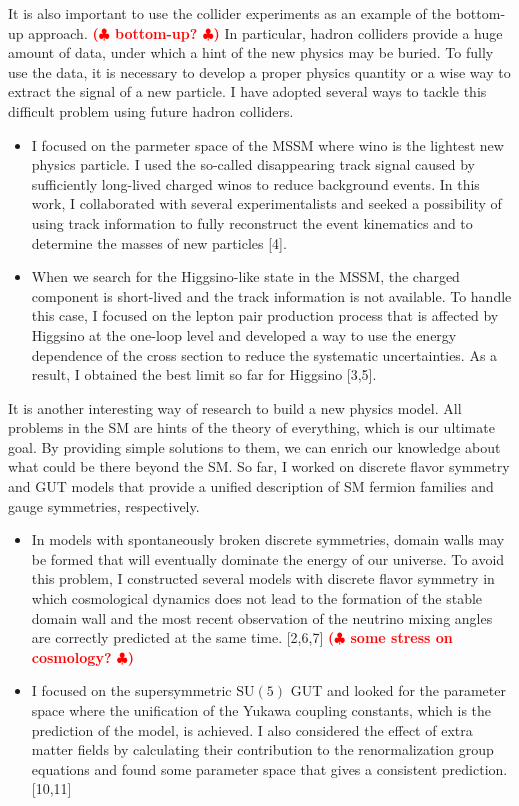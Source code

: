 \documentclass[12pt,notitlepage]{article}
\def\rem#1{ {\bf\textcolor{red}{($\clubsuit$ #1 $\clubsuit$)}}}
\begin{document}
It is also important to use the collider experiments as an example of the bottom-up approach.
\rem{bottom-up?}
In particular, hadron colliders provide a huge amount of data, under which a hint of the new physics may be buried.
To fully use the data, it is necessary to develop a proper physics quantity or a wise way to extract the signal of a new particle.
I have adopted several ways to tackle this difficult problem using future hadron colliders.
\begin{itemize}
  \item
    I focused on the parmeter space of the MSSM where wino is the lightest new physics particle.
    I used the so-called disappearing track signal caused by sufficiently long-lived charged winos to reduce background events.
    In this work, I collaborated with several experimentalists and seeked a possibility of using track information to fully reconstruct the event kinematics and to determine the masses of new particles [4].
  \item
    When we search for the Higgsino-like state in the MSSM, the charged component is short-lived and the track information is not available.
    To handle this case, I focused on the lepton pair production process that is affected by Higgsino at the one-loop level and developed a way to use the energy dependence of the cross section to reduce the systematic uncertainties.
    As a result, I obtained the best limit so far for Higgsino [3,5].
\end{itemize}

It is another interesting way of research to build a new physics model.
All problems in the SM are hints of the theory of everything, which is our ultimate goal.
By providing simple solutions to them, we can enrich our knowledge about what could be there beyond the SM.
So far, I worked on discrete flavor symmetry and GUT models that provide a unified description of SM fermion families and gauge symmetries, respectively.
\begin{itemize}
  \item In models with spontaneously broken discrete symmetries, domain walls may be formed that will eventually dominate the energy of our universe.
  To avoid this problem, I constructed several models with discrete flavor symmetry in which cosmological dynamics does not lead to the formation of the stable domain wall and the most recent observation of the neutrino mixing angles are correctly predicted at the same time. [2,6,7]
  \rem{some stress on cosmology?}
  \item I focused on the supersymmetric $\mathrm{SU}(5)$ GUT and looked for the parameter space where the unification of the Yukawa coupling constants, which is the prediction of the model, is achieved.
  I also considered the effect of extra matter fields by calculating their contribution to the renormalization group equations and found some parameter space that gives a consistent prediction. [10,11]
\end{itemize}
\end{document}
